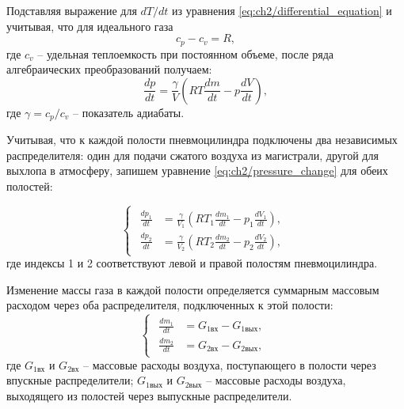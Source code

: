 Подставляя выражение для $dT/dt$ из уравнения \eqref{eq:ch2/differential_equation} и учитывая, что для идеального газа
\begin{equation}\label{eq:ch2/specific_heat_difference}
    c_p - c_v = R,
\end{equation}
где $c_v$ -- удельная теплоемкость при постоянном объеме, после ряда алгебраических преобразований получаем:
\begin{equation}\label{eq:ch2/pressure_change}
    \frac{dp}{dt} = \frac{\gamma}{V}\left(RT\frac{dm}{dt} - p\frac{dV}{dt}\right),
\end{equation}
где $\gamma = c_p/c_v$ -- показатель адиабаты.

Учитывая, что к каждой полости пневмоцилиндра подключены два независимых распределителя:
один для подачи сжатого воздуха из магистрали, другой для выхлопа в атмосферу,
запишем уравнение \eqref{eq:ch2/pressure_change} для обеих полостей:

\begin{equation}\label{eq:ch2/pressure_system}
    \begin{cases}
        \begin{aligned}
            \frac{dp_1}{dt} & = \frac{\gamma}{V_1}\left(RT_1\frac{dm_1}{dt} - p_1\frac{dV_1}{dt}\right), \\
            \frac{dp_2}{dt} & = \frac{\gamma}{V_2}\left(RT_2\frac{dm_2}{dt} - p_2\frac{dV_2}{dt}\right),
        \end{aligned}
    \end{cases}
\end{equation}
где индексы 1 и 2 соответствуют левой и правой полостям пневмоцилиндра.

Изменение массы газа в каждой полости определяется суммарным массовым
расходом через оба распределителя, подключенных к этой полости:
\begin{equation}\label{eq:ch2/mass_change}
    \begin{cases}
        \begin{aligned}
            \frac{dm_1}{dt} & = G_{1\text{вх}} - G_{1\text{вых}}, \\
            \frac{dm_2}{dt} & = G_{2\text{вх}} - G_{2\text{вых}},
        \end{aligned}
    \end{cases}
\end{equation}
где $G_{1\text{вх}}$ и $G_{2\text{вх}}$ -- массовые расходы воздуха, поступающего в полости через впускные распределители;
$G_{1\text{вых}}$ и $G_{2\text{вых}}$ -- массовые расходы воздуха, выходящего из полостей через выпускные распределители.

